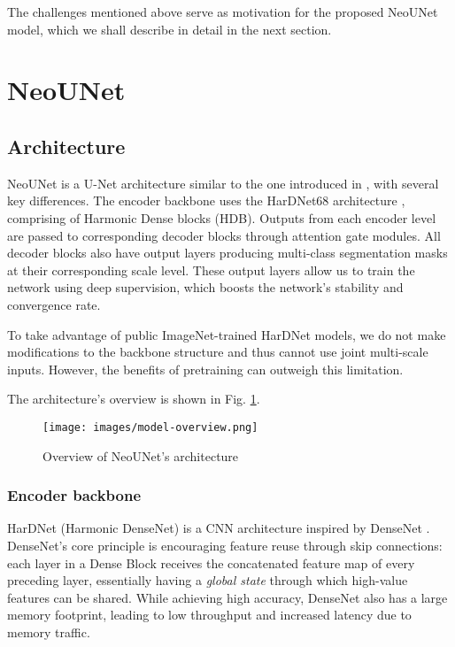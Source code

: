 \documentclass[runningheads]{llncs}
\newcommand{\ModelName}{NeoUNet\xspace}
\begin{document}
	The challenges mentioned above serve as motivation for the proposed \ModelName model, which we shall describe in detail in the next section.

	\section{\ModelName}
	\label{sec:model}
	\subsection{Architecture}
	\ModelName is a U-Net architecture similar to the one introduced in \cite{abraham2019novel}, with several key differences. The encoder backbone uses the HarDNet68 architecture \cite{chao2019hardnet}, comprising of Harmonic Dense blocks (HDB). Outputs from each encoder level are passed to corresponding decoder blocks through attention gate modules. All decoder blocks also have output layers producing multi-class segmentation masks at their corresponding scale level. These output layers allow us to train the network using deep supervision, which boosts the network's stability and convergence rate.

	To take advantage of public ImageNet-trained HarDNet models, we do not make modifications to the backbone structure and thus cannot use joint multi-scale inputs. However, the benefits of pretraining can outweigh this limitation.

	The architecture's overview is shown in Fig. \ref{fig:model-overview}.

	\begin{figure}
		\centering
		\texttt{[image: images/model-overview.png]}
		\caption{Overview of \ModelName{}'s architecture}
		\label{fig:model-overview}
	\end{figure}


	\subsubsection{Encoder backbone}
	HarDNet (Harmonic DenseNet) \cite{chao2019hardnet} is a CNN architecture inspired by DenseNet \cite{huang2017densely}. DenseNet's core principle is encouraging feature reuse through skip connections: each layer in a Dense Block receives the concatenated feature map of every preceding layer, essentially having a \textit{global state} through which high-value features can be shared. While achieving high accuracy, DenseNet also has a large memory footprint, leading to low throughput and increased latency due to memory traffic.
\end{document}
